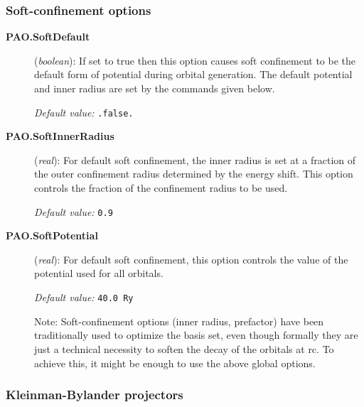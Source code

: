 \documentclass[11pt]{article}
\begin{document}
\subsubsection{Soft-confinement options}
\begin{description}

\item[{\bf PAO.SoftDefault}] ({\it boolean}):
If set to true then this option causes soft confinement to be the
default form
of potential during orbital generation. The default potential and
inner radius
are set by the commands given below.

{\it Default value:} {\tt .false.}

\item[{\bf PAO.SoftInnerRadius}] ({\it real}):
For default soft confinement, the inner radius is set at a fraction of
the outer
confinement radius determined by the energy shift. This option
controls the fraction
of the confinement radius to be used.

{\it Default value:} {\tt 0.9}

\item[{\bf PAO.SoftPotential}] ({\it real}):
For default soft confinement, this option controls the value of the
potential used
for all orbitals.

{\it Default value:} {\tt 40.0 Ry}


Note: Soft-confinement options (inner radius, prefactor) have been
traditionally used to optimize the basis set, even though formally
they are just a technical necessity to soften the decay of the
orbitals at rc. To achieve this, it might be enough to use the above
global options.

\end{description}

\subsubsection{Kleinman-Bylander projectors}
\end{document}
